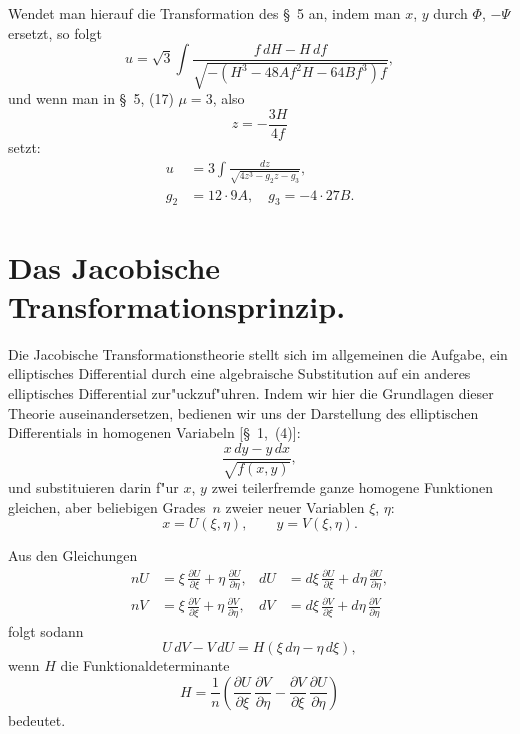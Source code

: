 \documentclass[12pt,a4paper]{article}
\theoremstyle{definition}
\begin{document}
Wendet man hierauf die Transformation des \S~5 an, indem man $x$, $y$ durch $\Phi$, $-\Psi$ ersetzt, so folgt
\[
u = \sqrt{3}\int\frac{f\,dH - H\,df}{\sqrt{-(H^3 - 48Af^2H - 64Bf^3)f}},
\]
und wenn man in \S~5, (17) $\mu = 3$, also
\[z = -\frac{3H}{4f}
\]
setzt:
\begin{align*}
u &= 3\int\frac{dz}{\sqrt{4z^3 - g_2z - g_3}},\\
g_2 &= 12\cdot 9A,\quad g_3 = -4\cdot 27B.
\end{align*}

\newpage

\section{Das Jacobische Transformationsprinzip.}

Die Jacobische Transformationstheorie stellt sich im allgemeinen die Aufgabe, ein elliptisches Differential durch eine algebraische Substitution auf ein anderes elliptisches Differential zur"uckzuf"uhren. Indem wir hier die Grundlagen dieser Theorie auseinandersetzen, bedienen wir uns der Darstellung des elliptischen Differentials in homogenen Variabeln [\S~1,~(4)]:
\begin{equation}\tag{1}
\frac{x\,dy - y\,dx}{\sqrt{f(x,y)}},
\end{equation}
und substituieren darin f"ur $x$, $y$ zwei teilerfremde ganze homogene Funktionen gleichen, aber beliebigen Grades~$n$ zweier neuer Variablen $\xi$, $\eta$:
\begin{equation}\tag{2}
x = U(\xi,\eta),\qquad y = V(\xi,\eta).
\end{equation}

Aus den Gleichungen
\begin{align*}
nU &= \xi\,\frac{\partial U}{\partial\xi} + \eta\,\frac{\partial U}{\partial\eta}, & dU &= d\xi\,\frac{\partial U}{\partial\xi} + d\eta\,\frac{\partial U}{\partial\eta},\\
nV &= \xi\,\frac{\partial V}{\partial\xi} + \eta\,\frac{\partial V}{\partial\eta}, & dV &= d\xi\,\frac{\partial V}{\partial\xi} + d\eta\,\frac{\partial V}{\partial\eta}
\end{align*}
folgt sodann
\begin{equation}\tag{3}
U\,dV - V\,dU = H(\xi\,d\eta - \eta\,d\xi),
\end{equation}
wenn $H$ die Funktionaldeterminante
\begin{equation}\tag{4}
H = \frac{1}{n}\left(\frac{\partial U}{\partial\xi}\,\frac{\partial V}{\partial\eta} - \frac{\partial V}{\partial\xi}\,\frac{\partial U}{\partial\eta}\right)
\end{equation}
bedeutet.
\end{document}
